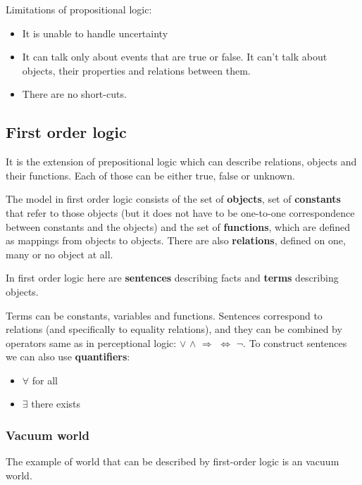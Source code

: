 \documentclass[a4paper,10pt]{article}
\begin{document}
Limitations of propositional logic:\begin{itemize}
\setlength{\itemsep}{0pt}
\setlength{\parskip}{0pt}
\setlength{\parsep}{0pt}
\item It is unable to handle uncertainty
\item It can talk only about events that are true or false. It can't talk about objects, their properties and relations between them.
\item There are no short-cuts. 
\end{itemize}

\subsection{First order logic}

It is the extension of prepositional logic which can describe relations, objects and their functions.  Each of those can be either true, false or unknown.

The model in first order logic consists of the set of \textbf{objects}, set of \textbf{constants} that refer to those objects (but it does not have to be one-to-one correspondence between constants and the objects) and the set of \textbf{functions}, which are defined as mappings from objects to objects. There are also \textbf{relations}, defined on one, many or no object at all.

In first order logic here are \textbf{sentences} describing facts and \textbf{terms} describing objects. 

Terms can be constants, variables and functions. Sentences correspond to relations (and specifically to equality relations), and they can be combined by operators same as in perceptional logic: $\vee$ $\wedge$ $\Rightarrow$ $\Leftrightarrow$ $\lnot$. To construct sentences we can also use \textbf{quantifiers}:
\begin{itemize}
\setlength{\itemsep}{0pt}
\setlength{\parskip}{0pt}
\setlength{\parsep}{0pt}
\item $\forall$ for all
\item $\exists$ there exists
\end{itemize}

\subsubsection*{Vacuum world}

The example of world that can be described by first-order logic is an vacuum world.
\end{document}
